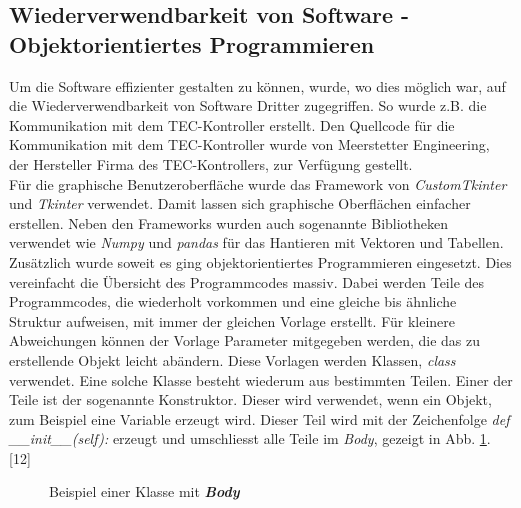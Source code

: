 

\subsection{Wiederverwendbarkeit von Software - Objektorientiertes Programmieren}
Um die Software effizienter gestalten zu können, wurde, wo dies möglich war, auf die Wiederverwendbarkeit von Software Dritter zugegriffen. So wurde z.B. die Kommunikation mit dem TEC-Kontroller erstellt. Den Quellcode für die Kommunikation mit dem TEC-Kontroller wurde von Meerstetter Engineering, der Hersteller Firma des TEC-Kontrollers, zur Verfügung gestellt.\\
Für die graphische Benutzeroberfläche wurde das Framework von \textit{CustomTkinter} und \textit{Tkinter} verwendet. Damit lassen sich graphische Oberflächen einfacher erstellen. Neben den Frameworks wurden auch sogenannte Bibliotheken verwendet wie \textit{Numpy} und \textit{pandas} für das Hantieren mit Vektoren und Tabellen.\\

Zusätzlich wurde soweit es ging objektorientiertes Programmieren eingesetzt. Dies vereinfacht die Übersicht des Programmcodes massiv. Dabei werden Teile des Programmcodes, die wiederholt vorkommen und eine gleiche bis ähnliche Struktur aufweisen, mit immer der gleichen Vorlage erstellt. Für kleinere Abweichungen können der Vorlage Parameter mitgegeben werden, die das zu erstellende Objekt leicht abändern. Diese Vorlagen werden Klassen, \textit{class} verwendet. Eine solche Klasse besteht wiederum aus bestimmten Teilen. Einer der Teile ist der sogenannte Konstruktor. Dieser wird verwendet, wenn ein Objekt, zum Beispiel eine Variable erzeugt wird. Dieser Teil wird mit der Zeichenfolge \textit{def \_\_init\_\_(self):} erzeugt und umschliesst alle Teile im \textit{Body}, gezeigt in Abb. \ref{fig:class_example}. [12]\\

\begin{figure}
    \centering
    \caption{Beispiel einer Klasse mit \textit{\textbf{Body}}}
    \label{fig:class_example}
\end{figure}

